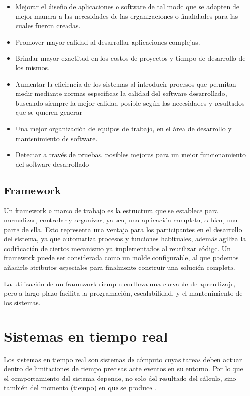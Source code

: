 \begin{itemize}
\item Mejorar el diseño de aplicaciones o software de tal modo que se adapten de mejor manera a las necesidades de las organizaciones o finalidades para las cuales fueron creadas.
\item Promover mayor calidad al desarrollar aplicaciones complejas.
\item Brindar mayor exactitud en los costos de proyectos y tiempo de desarrollo de los mismos.
\item Aumentar la eficiencia de los sistemas al introducir procesos que permitan medir mediante normas específicas la calidad del software desarrollado, buscando siempre la mejor calidad posible según las necesidades y resultados que se quieren generar.
\item Una mejor organización de equipos de trabajo, en el área de desarrollo y mantenimiento de software.
\item Detectar a través de pruebas, posibles mejoras para un mejor funcionamiento del software desarrollado     
\end{itemize}     
     
     \subsection{Framework}
Un framework o marco de trabajo es la estructura que se establece para normalizar, controlar y organizar, ya sea, una aplicación completa, o bien, una parte de ella. Esto representa una ventaja para los participantes en el desarrollo del sistema, ya que automatiza procesos y funciones habituales, además agiliza la codificación de ciertos mecanismo ya implementados al reutilizar código.
Un framework puede ser considerada como un molde configurable, al que podemos añadirle atributos especiales para finalmente construir una solución completa.

\vspace{0.3cm}
La utilización de un framework siempre conlleva una curva de de aprendizaje, pero a largo plazo facilita la programación, escalabilidad, y el mantenimiento de los sistemas.

    \section{Sistemas en tiempo real}\label{sec:sistr}

    Los sistemas en tiempo real son sistemas de cómputo cuyas tareas deben actuar dentro de limitaciones de tiempo precisas ante eventos en su entorno. Por lo que el comportamiento del sistema depende, no solo del resultado del cálculo, sino también del momento (tiempo) en que se produce \cite{Buta2011}.

